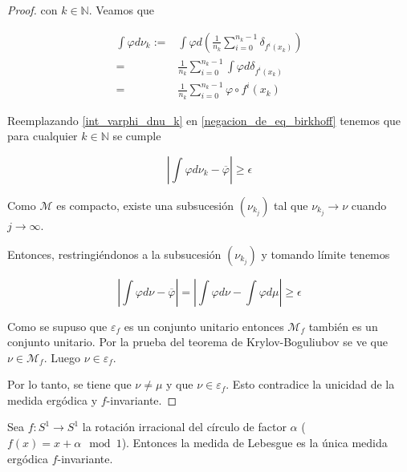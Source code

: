 \begin{proof}
	con $k \in \mathbb{N}$. Veamos que
	
	\begin{align}
		\int \varphi d\nu_k := & \int \varphi d\left( \frac{1}{n_k} \sum_{i=0}^{n_k-1} \delta_{f^i(x_k)} \right)\\
		=& \frac{1}{n_k} \sum_{i=0}^{n_k-1} \int \varphi d\delta_{f^i(x_k)}\\
		=& \frac{1}{n_k} \sum_{i=0}^{n_k-1} \varphi \circ f^i(x_k) \label{int_varphi_dnu_k}
	\end{align}
	
	Reemplazando \eqref{int_varphi_dnu_k} en \eqref{negacion_de_eq_birkhoff} tenemos que para cualquier $k \in \mathbb{N}$ se cumple
	
	\begin{equation}
		\left| \int \varphi d\nu_k - \overline{\varphi} \right| \geq \epsilon
	\end{equation}
	
	Como $\mathcal{M}$ es compacto, existe una subsucesión $(\nu_{k_j})$ tal que $\nu_{k_j} \rightarrow \nu$ cuando $j \rightarrow \infty$.
	
	Entonces, restringiéndonos a la subsucesión $(\nu_{k_j})$ y tomando límite tenemos
	
	\begin{equation}
		\left| \int \varphi d\nu - \overline{\varphi} \right| = \left| \int \varphi d\nu - \int \varphi d\mu \right| \geq \epsilon
	\end{equation}
	
	Como se supuso que $\varepsilon_f$ es un conjunto unitario entonces $\mathcal{M}_f$ también es un conjunto unitario. Por la prueba del teorema de Krylov-Boguliubov se ve que $\nu \in \mathcal{M}_f$. Luego $\nu \in \varepsilon_f$. 
	
	Por lo tanto, se tiene que $\nu \neq \mu$  y que $\nu \in \varepsilon_f$. Esto contradice la unicidad de la medida ergódica y $f$-invariante.
\end{proof}



\begin{teorema}\label{main1}
  Sea $ f: S^1 \rightarrow S^1 $ la rotación irracional del círculo de factor $ \alpha $ ($ f(x) = x+\alpha \mod 1 $). Entonces la medida de Lebesgue es la única medida ergódica $f$-invariante.
\end{teorema}

